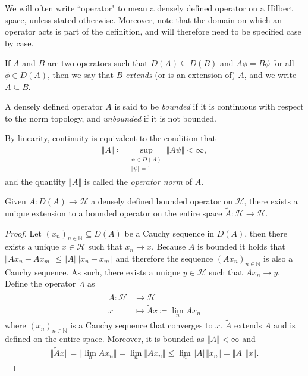 We will often write ``operator" to mean a densely defined operator on a Hilbert space, unless
stated otherwise. Moreover, note that the domain on which an operator acts is part of the
definition, and will therefore need to be specified case by case.

\begin{definition}
	If $A$ and $B$ are two operators such that $D(A) \subseteq D(B)$ and $A\phi = B\phi$ for
	all $\phi\in D(A)$, then we say that $B$ \textit{extends} (or is an extension of) $A$,
	and we write $A \subseteq B$.
\end{definition}

\begin{definition}
	A densely defined operator $A$ is said to be \textit{bounded} if it is continuous with
	respect to the norm topology, and \textit{unbounded} if it is not bounded.
\end{definition}
\begin{remark}
	By linearity, continuity is equivalent to the condition that
	\begin{align*}
		\Vert A\Vert\coloneq\sup_{\substack{\psi\in D(A)\\\Vert\psi\Vert=1}}\Vert A\psi\Vert<\infty,
	\end{align*}
	and the quantity $\Vert A\Vert$ is called the \textit{operator norm} of $A$.
\end{remark}

\begin{proposition}
	\label{extension-of-densely-defined-operators}
	Given $A : D(A) \to \mathcal{H}$ a densely defined bounded operator on $\mathcal{H}$,
	there exists a unique extension to a bounded operator on the entire space
	$\tilde{A} : \mathcal{H} \to \mathcal{H}$.
\end{proposition}
\begin{proof}
	Let $(x_n)_{n\in\mathbb{N}}\subseteq D(A)$ be a Cauchy sequence in $D(A)$, then there
	exists a unique $x\in\mathcal{H}$ such that $x_n \to x$. Because $A$ is bounded it holds
	that $\Vert Ax_n - Ax_m\Vert \leq \Vert A\Vert\Vert x_n - x_m\Vert$ and therefore the
	sequence $(A x_n)_{n\in\mathbb{N}}$ is also a Cauchy sequence. As such, there exists a
	unique $y\in\mathcal{H}$ such that $Ax_n\to y$. Define the operator $\tilde{A}$ as
	\begin{align*}
		\tilde{A} : \mathcal{H} &\longrightarrow \mathcal{H}\\
		x &\longmapsto \tilde{A}x \coloneq \lim_{n} Ax_n
	\end{align*}
	where $(x_n)_{n\in\mathbb{N}}$ is a Cauchy sequence that converges to $x$. $\tilde{A}$
	extends $A$ and is defined on the entire space. Moreover, it is bounded as
	$\Vert A\Vert<\infty$ and
	\begin{align*}
		\Vert \tilde{A}x\Vert = \Vert\lim_{n}Ax_n\Vert
		= \lim_{n}\Vert Ax_n\Vert \leq \lim_{n}\Vert A\Vert\Vert x_n\Vert
		= \Vert A\Vert\Vert x\Vert.
	\end{align*}
\end{proof}

